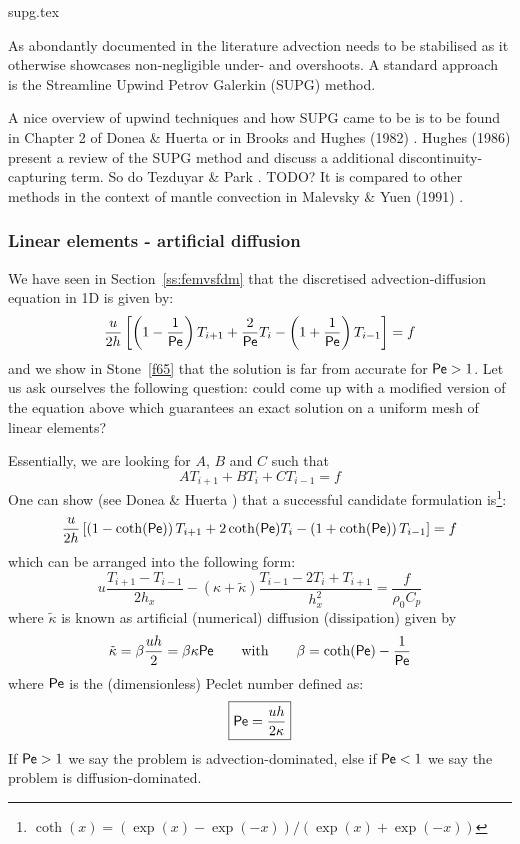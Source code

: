 \begin{flushright} {\tiny {\color{gray} supg.tex}} \end{flushright}

As abondantly documented in the literature advection needs to be stabilised
as it otherwise showcases non-negligible under- and overshoots.
A standard approach is the Streamline Upwind Petrov Galerkin (SUPG) method.

A nice overview of upwind techniques and how SUPG came to be is to be found in Chapter 
2 of Donea \& Huerta \cite{dohu03} or in Brooks and Hughes (1982) \cite{brhu82}.
Hughes \etal (1986) \cite{humm86} present a review of the SUPG method 
and discuss a additional discontinuity-capturing term. So do Tezduyar \& Park \cite{tepa86}.
TODO? It is compared to other methods in the context of mantle convection in 
Malevsky \& Yuen (1991) \cite{mayu91}. 







\subsubsection{Linear elements - artificial diffusion}

We have seen in Section~\ref{ss:femvsfdm} that the discretised advection-diffusion equation 
in 1D is given by:
\[
\frac{u}{2h}
\left[
\left(1-\frac{1}{{\mathsf{Pe}}}\right) T_{i+1} + \frac{2}{{\mathsf{Pe}}} T_i - \left(1+\frac{1}{{\mathsf{Pe}}}\right)T_{i-1} 
\right] = f
\]
and we show in Stone~\ref{f65} that the solution is far from accurate for ${\mathsf{Pe}}>1$. Let us ask ourselves the 
following question: could come up with a modified version of the equation above which 
guarantees an exact solution on a uniform mesh of linear elements?

Essentially, we are looking for $A$, $B$ and $C$ such that 
\[
A T_{i+1} + BT_i + C T_{i-1} = f
\]
One can show (see Donea \& Huerta \cite{dohu03}) that a successful candidate formulation 
is\footnote{$\coth(x)=(\exp(x)-\exp(-x))/(\exp(x)+\exp(-x))$}:
\[
\frac{u}{2h}
\left[
\left(1-\coth({\mathsf{Pe}}) \right) T_{i+1} + 2 \coth({\mathsf{Pe}}) T_i - \left(1+\coth({\mathsf{Pe}})\right) T_{i-1} 
\right] = f
\]
which can be arranged into the following form:
\begin{equation}
u
\frac{T_{i+1}-T_{i-1}}{2h_x}
-
(\kappa+ \tilde{\kappa})
\frac{T_{i-1}-2T_i+T_{i+1}}{h_x^2}
= \frac{f}{\rho_0 C_p}
\end{equation}
where 
$\tilde{\kappa}$ is known as artificial (numerical) diffusion (dissipation) given by
\[
\tilde{\kappa}=\beta \frac{u h}{2} = \beta \kappa {\mathsf{Pe}}
\qquad
\text{with}
\qquad
\beta = \coth ({\mathsf{Pe}}) - \frac{1}{{\mathsf{Pe}}}
\]
where ${\mathsf{Pe}}$ is the (dimensionless) Peclet number defined as: 
\[
\boxed{
{\mathsf{Pe}}= \frac{u h }{2 \kappa}
}
\]
If ${\mathsf{Pe}}>1$ we say the problem is advection-dominated, 
else if ${\mathsf{Pe}}<1$ we say the problem is diffusion-dominated.

